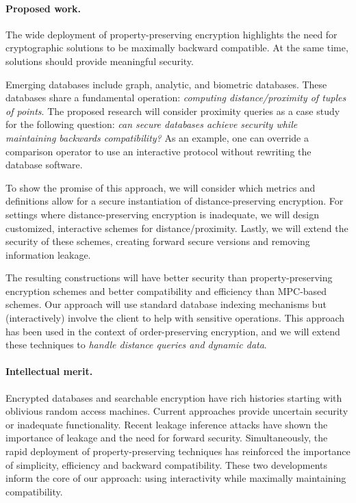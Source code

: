 \documentclass[11pt]{article}
\begin{document}
\paragraph{Proposed work.}
The wide deployment of property-preserving encryption highlights the need for cryptographic solutions to be maximally backward compatible.  At the same time, solutions should provide meaningful security.

Emerging databases include graph, analytic, and
biometric databases. These databases share a fundamental operation: {\em
computing distance/proximity of tuples of points}. The proposed research will
consider proximity queries as a case study for the following question: \emph{can secure databases achieve security while maintaining backwards compatibility?}  As an example, one can override a comparison operator to use an interactive protocol without rewriting the database software.

To show the promise of this approach, we will consider which metrics and definitions allow for a secure instantiation of distance-preserving encryption. For settings where distance-preserving encryption is inadequate, we will design
customized, interactive schemes for distance/proximity. Lastly, we will extend the security of these schemes, creating forward secure versions and removing information leakage.

The resulting constructions will have
better security than property-preserving encryption schemes and better compatibility and 
efficiency than MPC-based schemes. Our approach will use standard database indexing mechanisms but (interactively) involve the
client to help with sensitive operations. This approach has been used in the
context of order-preserving encryption, and we will extend these techniques to
{\em handle distance queries and dynamic data}.

%
%

\paragraph{Intellectual merit.}  
Encrypted databases and searchable encryption have rich histories starting with  oblivious random access machines.  Current approaches provide uncertain security or inadequate functionality.  Recent
leakage inference attacks have shown the importance of leakage and the need for forward
security.  Simultaneously, the rapid deployment of property-preserving
techniques has reinforced the importance of simplicity, efficiency and backward
compatibility.  These two developments inform the core of our approach: using
interactivity while maximally maintaining compatibility.
\end{document}
